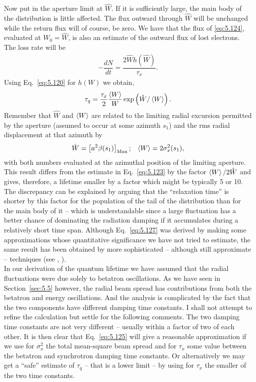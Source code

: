 \documentclass[../sands-adaptation.tex]{subfiles}
\begin{document}
Now put in the aperture limit at $\hat{W}$. If it is sufficiently large, the main body of the distribution is little affected. The flux outward through $\hat{W}$ will be unchanged while the return flux will of course, be zero. We have that the flux of \eqref{eq:5.124}, evaluated at $W_0 = \hat{W}$, is also an estimate of the outward flux of lost electrons. The loss rate will be
\begin{align}
	-\dfrac{dN}{dt} = \dfrac{2\hat{W}h(\hat{W})}{\tau_x}.
\end{align}
Using Eq.~\eqref{eq:5.120} for $h(W)$ we obtain,
\begin{align}\label{eq:5.127}
	\tau_q = \dfrac{\tau_x}{2} \dfrac{\left< W \right>}{W} \exp \left( \hat{W}/\left< W \right> \right).
\end{align}
Remember that $\hat{W}$ and $\left< W \right>$ are related to the limiting radial excursion permitted by the aperture (assumed to occur at some azimuth $s_1$) and the rms radial displacement at that azimuth by
\begin{align}
	\hat{W} = \left[ a^2 \beta(s_1) \right]_\text{Max}; && \left< W \right> = 2\sigma_x^2(s_1),
\end{align}
with both numbers evaluated at the azimuthal position of the limiting aperture.\\
This result differs from the estimate in Eq.~\eqref{eq:5.123} by the factor $\left< W \right>/2\hat{W}$ and gives, therefore, a lifetime smaller by a factor which might be typically 5 or 10. The discrepancy can be explained by arguing that the ``relaxation time'' is shorter by this factor for the population of the tail of the distribution than for the main body of it -- which is understandable since a large fluctuation has a better chance of dominating the radiation damping if it accumulates during a relatively short time span. Although Eq.~\eqref{eq:5.127} was derived by making some approximations whose quantitative significance we have not tried to estimate, the same result has been obtained by more sophisticated -- although still approximate -- techniques (see \cite{5}, \cite{15}).\\
In our derivation of the quantum lifetime we have assumed that the radial fluctuations were due solely to betatron oscillations. As we have seen in Section~\ref{sec:5.5} however, the radial beam spread has contributions from both the betatron and energy oscillations. And the analysis is complicated by the fact that the two components have different damping time constants. I shall not attempt to refine the calculation but settle for the following comments. The two damping time constants are not very different -- usually within a factor of two of each other. It is then clear that Eq.~\eqref{eq:5.125} will give a reasonable approximation if we use for $\sigma_x^2$ the total mean-square beam spread and for $\tau_x$ some value between the betatron and synchrotron damping time constants. Or alternatively we may get a ``safe'' estimate of $\tau_q$ -- that is a lower limit -- by using for $\tau_x$ the smaller of the two time constants.\\
\end{document}
